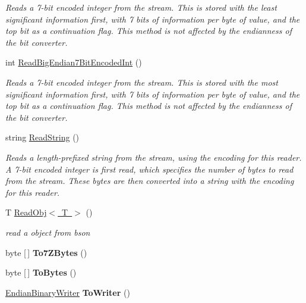 \begin{DoxyCompactItemize}
\begin{DoxyCompactList}\small\item\em Reads a 7-\/bit encoded integer from the stream. This is stored with the least significant information first, with 7 bits of information per byte of value, and the top bit as a continuation flag. This method is not affected by the endianness of the bit converter. \end{DoxyCompactList}\item 
int \mbox{\hyperlink{class_t_net_1_1_i_o_1_1_endian_binary_reader_a2826f200bdff02c21228316410d828a7}{Read\+Big\+Endian7\+Bit\+Encoded\+Int}} ()
\begin{DoxyCompactList}\small\item\em Reads a 7-\/bit encoded integer from the stream. This is stored with the most significant information first, with 7 bits of information per byte of value, and the top bit as a continuation flag. This method is not affected by the endianness of the bit converter. \end{DoxyCompactList}\item 
string \mbox{\hyperlink{class_t_net_1_1_i_o_1_1_endian_binary_reader_a62e1e8719419bc1b9f25e2fb58782039}{Read\+String}} ()
\begin{DoxyCompactList}\small\item\em Reads a length-\/prefixed string from the stream, using the encoding for this reader. A 7-\/bit encoded integer is first read, which specifies the number of bytes to read from the stream. These bytes are then converted into a string with the encoding for this reader. \end{DoxyCompactList}\item 
T \mbox{\hyperlink{class_t_net_1_1_i_o_1_1_endian_binary_reader_affb384d7c877291a2e2aa449f95c780b}{Read\+Obj$<$ T $>$}} ()
\begin{DoxyCompactList}\small\item\em read a object from bson \end{DoxyCompactList}\item 
\mbox{\label{class_t_net_1_1_i_o_1_1_endian_binary_reader_a003c25fc74556eabb23bce8925b37483}} 
byte \mbox{[}$\,$\mbox{]} {\bfseries To7\+Z\+Bytes} ()
\item 
\mbox{\label{class_t_net_1_1_i_o_1_1_endian_binary_reader_ab1b069f1fe4dd98eed25ca00f74a23df}} 
byte \mbox{[}$\,$\mbox{]} {\bfseries To\+Bytes} ()
\item 
\mbox{\label{class_t_net_1_1_i_o_1_1_endian_binary_reader_afbdea4b151d2bee6b8863349042785f5}} 
\mbox{\hyperlink{class_t_net_1_1_i_o_1_1_endian_binary_writer}{Endian\+Binary\+Writer}} {\bfseries To\+Writer} ()
\end{DoxyCompactItemize}
